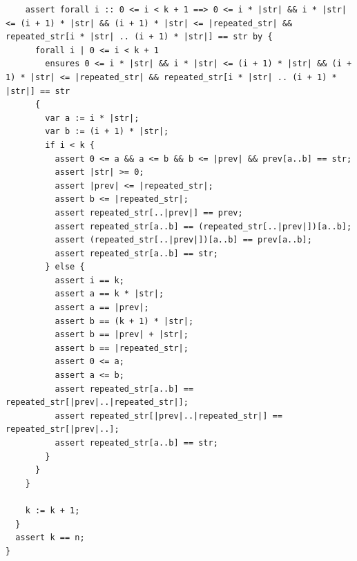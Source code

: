 \documentclass{article}
\begin{document}
\begin{lstlisting}
    assert forall i :: 0 <= i < k + 1 ==> 0 <= i * |str| && i * |str| <= (i + 1) * |str| && (i + 1) * |str| <= |repeated_str| && repeated_str[i * |str| .. (i + 1) * |str|] == str by {
      forall i | 0 <= i < k + 1
        ensures 0 <= i * |str| && i * |str| <= (i + 1) * |str| && (i + 1) * |str| <= |repeated_str| && repeated_str[i * |str| .. (i + 1) * |str|] == str
      {
        var a := i * |str|;
        var b := (i + 1) * |str|;
        if i < k {
          assert 0 <= a && a <= b && b <= |prev| && prev[a..b] == str;
          assert |str| >= 0;
          assert |prev| <= |repeated_str|;
          assert b <= |repeated_str|;
          assert repeated_str[..|prev|] == prev;
          assert repeated_str[a..b] == (repeated_str[..|prev|])[a..b];
          assert (repeated_str[..|prev|])[a..b] == prev[a..b];
          assert repeated_str[a..b] == str;
        } else {
          assert i == k;
          assert a == k * |str|;
          assert a == |prev|;
          assert b == (k + 1) * |str|;
          assert b == |prev| + |str|;
          assert b == |repeated_str|;
          assert 0 <= a;
          assert a <= b;
          assert repeated_str[a..b] == repeated_str[|prev|..|repeated_str|];
          assert repeated_str[|prev|..|repeated_str|] == repeated_str[|prev|..];
          assert repeated_str[a..b] == str;
        }
      }
    }

    k := k + 1;
  }
  assert k == n;
}
\end{lstlisting}
\end{document}

